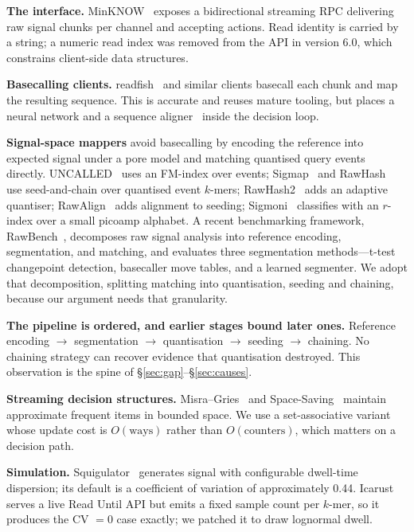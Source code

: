\documentclass[sigconf,nonacm]{acmart}
\begin{document}
\textbf{The interface.} MinKNOW~\cite{minknow} exposes a bidirectional streaming RPC delivering
raw signal chunks per channel and accepting actions. Read identity is carried by a string; a
numeric read index was removed from the API in version 6.0, which constrains client-side data
structures.

\textbf{Basecalling clients.} readfish~\cite{readfish} and similar clients basecall each chunk
and map the resulting sequence. This is accurate and reuses mature tooling, but places a neural
network and a sequence aligner~\cite{minimap2} inside the decision loop.

\textbf{Signal-space mappers} avoid basecalling by encoding the reference into expected signal
under a pore model and matching quantised query events directly. UNCALLED~\cite{uncalled} uses
an FM-index over events; Sigmap~\cite{sigmap} and RawHash~\cite{rawhash} use seed-and-chain
over quantised event $k$-mers; RawHash2~\cite{rawhash2} adds an adaptive quantiser;
RawAlign~\cite{rawalign} adds alignment to seeding; Sigmoni~\cite{sigmoni} classifies with an
$r$-index over a small picoamp alphabet. A recent benchmarking framework,
RawBench~\cite{rawbench}, decomposes raw signal analysis into reference encoding, segmentation,
and matching, and evaluates three segmentation methods---t-test changepoint detection,
basecaller move tables, and a learned segmenter. We adopt that decomposition, splitting
matching into quantisation, seeding and chaining, because our argument needs that granularity.

\textbf{The pipeline is ordered, and earlier stages bound later ones.} Reference encoding
$\rightarrow$ segmentation $\rightarrow$ quantisation $\rightarrow$ seeding $\rightarrow$
chaining. No chaining strategy can recover evidence that quantisation destroyed. This
observation is the spine of \S\ref{sec:gap}--\S\ref{sec:causes}.

\textbf{Streaming decision structures.} Misra--Gries~\cite{misragries} and
Space-Saving~\cite{spacesaving} maintain approximate frequent items in bounded space. We use a
set-associative variant whose update cost is $O(\text{ways})$ rather than
$O(\text{counters})$, which matters on a decision path.

\textbf{Simulation.} Squigulator~\cite{squigulator} generates signal with configurable
dwell-time dispersion; its default is a coefficient of variation of approximately 0.44.
Icarust~\cite{icarust} serves a live Read Until API but emits a fixed sample count per
$k$-mer, so it produces the CV $= 0$ case exactly; we patched it to draw lognormal dwell.
\end{document}
